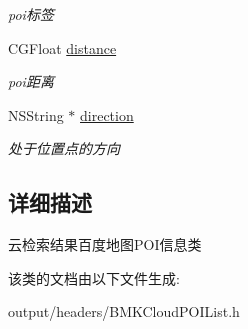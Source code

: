 \begin{DoxyCompactItemize}
\begin{DoxyCompactList}\small\item\em poi标签 \end{DoxyCompactList}\item 
\hypertarget{interface_b_m_k_cloud_map_p_o_i_info_a851bb506b63a79c627d2bf1f00f879e2}{}C\+G\+Float \hyperlink{interface_b_m_k_cloud_map_p_o_i_info_a851bb506b63a79c627d2bf1f00f879e2}{distance}\label{interface_b_m_k_cloud_map_p_o_i_info_a851bb506b63a79c627d2bf1f00f879e2}

\begin{DoxyCompactList}\small\item\em poi距离 \end{DoxyCompactList}\item 
\hypertarget{interface_b_m_k_cloud_map_p_o_i_info_aeda9115ec58c4f4aca8ddbfa0ffae2c8}{}N\+S\+String $\ast$ \hyperlink{interface_b_m_k_cloud_map_p_o_i_info_aeda9115ec58c4f4aca8ddbfa0ffae2c8}{direction}\label{interface_b_m_k_cloud_map_p_o_i_info_aeda9115ec58c4f4aca8ddbfa0ffae2c8}

\begin{DoxyCompactList}\small\item\em 处于位置点的方向 \end{DoxyCompactList}\end{DoxyCompactItemize}


\subsection{详细描述}
云检索结果百度地图\+P\+O\+I信息类 

该类的文档由以下文件生成\+:\begin{DoxyCompactItemize}
\item 
output/headers/B\+M\+K\+Cloud\+P\+O\+I\+List.\+h\end{DoxyCompactItemize}
